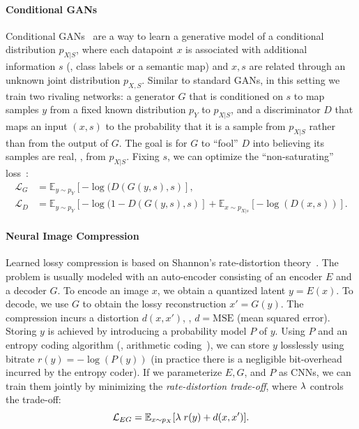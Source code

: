 \paragraph{Conditional GANs}
Conditional GANs~\cite{goodfellow2014generative,mirza2014conditional} are a way to learn a generative model of a conditional distribution $p_{X|S}$, where each datapoint $x$ is associated with additional information $s$ (\eg, class labels or a semantic map)
and $x, s$ are related through an unknown joint distribution $p_{X,S}$. 
Similar to standard GANs, in this setting we train two rivaling networks: 
a generator $G$ that is conditioned on $s$ to map samples $y$ from a fixed known distribution $p_Y$ to $p_{X|S}$, and a discriminator $D$ that maps an input $(x, s)$ to the probability that it is a sample from $p_{X|S}$ rather than from the output of $G$. The goal is for $G$ to ``fool'' $D$ into believing its samples are real, \ie, from $p_{X|S}$. 
Fixing $s$, we can optimize the ``non-saturating'' loss~\cite{goodfellow2014generative}:
\begin{align}
    \mathcal{L}_G &= \mathbb{E}_{y \sim p_Y} [ 
            -\log(D(G(y, s), s) ], \nonumber \\
    \mathcal{L}_D &= \mathbb{E}_{y \sim p_Y} [ 
            -\log(1 - D(G(y, s), s) ]
            + \mathbb{E}_{x \sim p_{X|s}} [ -\log(D(x, s)) ]. 
            \label{hific:eq:nonsat}
\end{align}
 

\paragraph{Neural Image Compression}
Learned lossy compression is based on Shannon's rate-distortion theory~\cite{cover2012elements}. 
The problem is usually modeled with an auto-encoder consisting of an encoder $E$ and a decoder $G$. To encode an image $x$, we obtain a quantized latent $y = E(x)$. To decode, we use $G$ to obtain the lossy reconstruction $x' = G(y)$. The compression incurs a distortion $d(x, x')$, \eg, $d = \text{MSE}$ (mean squared error).
Storing $y$ is achieved by introducing a probability model $P$ of $y$. Using $P$ and an entropy coding algorithm (\eg, arithmetic coding~\cite{marpe2003context}), we can store $y$ losslessly using bitrate $r(y) = - \log(P(y))$ (in practice there is a negligible bit-overhead incurred by the entropy coder).
If we parameterize $E, G$, and $P$ as CNNs, we can train them jointly by minimizing the \emph{rate-distortion trade-off},
where $\lambda$ controls the trade-off:
\begin{equation}
    \mathcal{L}_{EG} = \mathbb{E}_{x \sim p_X} [
    \lambda \; r(y) + d(x, x')]. \label{hific:eq:rd}
\end{equation}



